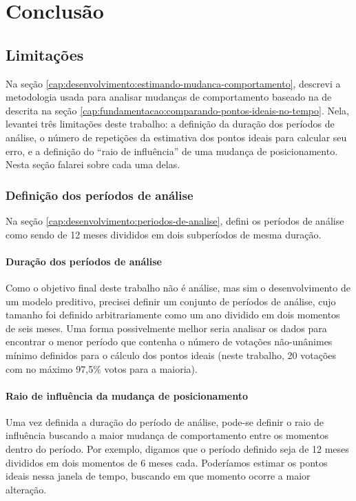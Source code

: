 \chapter{Conclusão}\label{cap:conclusao}

\section{Limitações}
\label{cap:conclusao:limitacoes}

Na seção \ref{cap:desenvolvimento:estimando-mudanca-comportamento}, descrevi a
metodologia usada para analisar mudanças de comportamento baseado na de
 descrita na seção
\ref{cap:fundamentacao:comparando-pontos-ideais-no-tempo}.  Nela, levantei três
limitações deste trabalho: a definição da duração dos períodos de análise, o
número de repetições da estimativa dos pontos ideais para calcular seu erro, e
a definição do ``raio de influência'' de uma mudança de posicionamento. Nesta
seção falarei sobre cada uma delas.

\subsection{Definição dos períodos de análise}

Na seção \ref{cap:desenvolvimento:periodos-de-analise}, defini os períodos de análise
como sendo de 12 meses divididos em dois subperíodos de mesma duração.

\subsubsection*{Duração dos períodos de análise}

Como o objetivo final deste trabalho não é análise, mas sim o desenvolvimento
de um modelo preditivo, precisei definir um conjunto de períodos de análise,
cujo tamanho foi definido arbitrariamente como um ano dividido em dois momentos
de seis meses. Uma forma possivelmente melhor seria analisar os dados para
encontrar o menor período que contenha o número de votações não-unânimes mínimo
definidos para o cálculo dos pontos ideais (neste trabalho, 20 votações com no
máximo 97,5\% votos para a maioria).

\subsubsection*{Raio de influência da mudança de posicionamento}

Uma vez definida a duração do período de análise, pode-se definir o raio de
influência buscando a maior mudança de comportamento entre os momentos dentro
do período. Por exemplo, digamos que o período definido seja de 12 meses
divididos em dois momentos de 6 meses cada. Poderíamos estimar os pontos ideais
nessa janela de tempo, buscando em que momento ocorre a maior alteração.
